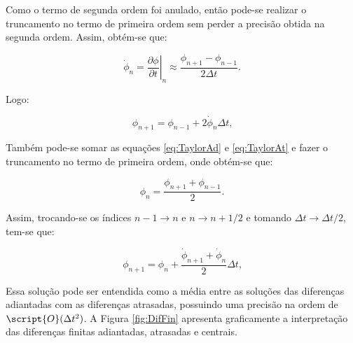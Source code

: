 \documentclass[_ArquivoPrincipal.tex]{subfiles}
\begin{document}
Como o termo de segunda ordem foi anulado, então pode-se realizar o truncamento no termo de primeira ordem sem perder a precisão obtida na segunda ordem. Assim, obtém-se que:

\begin{equation}
    \dot{\phi}_n=\left.\frac{\partial\phi}{\partial t}\right|_n\approx\frac{\phi_{n+1}-\phi_{n-1}}{2\Delta t}\text{.}
\end{equation}

\noindent Logo:

\begin{equation}
    \phi_{n+1}=\phi_{n-1}+2\dot{\phi}_n\Delta t\text{,}
\end{equation}

Também pode-se somar as equações \ref{eq:TaylorAd} e \ref{eq:TaylorAt} e fazer o truncamento no termo de primeira ordem, onde obtém-se que:

\begin{equation}
    \phi_n=\frac{\phi_{n+1}+\phi_{n-1}}{2}\text{.}
\end{equation}

Assim, trocando-se os índices $n-1\to n$ e $n\to n+1/2$ e tomando $\Delta t\to\Delta t/2$, tem-se que:

\begin{equation}
    \phi_{n+1}=\phi_n+\frac{\dot{\phi}_{n+1}+\dot{\phi}_n}{2}\Delta t\text{,}
\end{equation}

Essa solução pode ser entendida como a média entre as soluções das diferenças adiantadas com as diferenças atrasadas, possuindo uma precisão na ordem de $\script{O}(\Delta t^2)$. A Figura \ref{fig:DifFin} apresenta graficamente a interpretação das diferenças finitas adiantadas, atrasadas e centrais.
\end{document}
